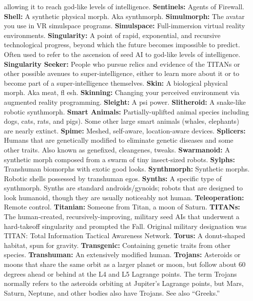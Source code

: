 allowing it to reach god-like levels of intelligence.
\textbf{ Sentinels:} Agents of Firewall.
\textbf{ Shell:} A synthetic physical morph. Aka synthmorph.
\textbf{ Simulmorph:} The avatar you use in VR simulspace 
programs.
\textbf{ Simulspace:} Full-immersion virtual reality environments.
\textbf{ Singularity:} A point of rapid, exponential, and recursive 
technological progress, beyond which the future becomes 
impossible to predict. Often used to refer to the ascension 
of seed AI to god-like levels of intelligence.
\textbf{ Singularity Seeker:} People who pursue relics and 
evidence of the TITANs or other possible avenues to 
super-intelligence, either to learn more about it or to 
become part of a super-intelligence themselves.
\textbf{ Skin:} A biological physical morph. Aka meat, ﬂ esh.
\textbf{ Skinning:} Changing your perceived environment via 
augmented reality programming.
\textbf{ Sleight:} A psi power.
\textbf{ Slitheroid:} A snake-like robotic synthmorph.
\textbf{ Smart Animals:} Partially-uplifted animal species including
dogs, cats, rats, and pigs). Some other large smart
animals (whales, elephants) are nearly extinct.
\textbf{ Spime:} Meshed, self-aware, location-aware devices.
\textbf{ Splicers:} Humans that are genetically modified to 
eliminate genetic diseases and some other traits. Also 
known as genefixed, cleangenes, tweaks.
\textbf{ Swarmanoid:} A synthetic morph composed from a 
swarm of tiny insect-sized robots.
\textbf{ Sylphs:} Transhuman biomorphs with exotic good looks.
\textbf{ Synthmorph:} Synthetic morphs. Robotic shells possessed 
by transhuman egos.
\textbf{ Synths:} A specific type of synthmorph. Synths are 
standard androids/gynoids; robots that are designed to 
look humanoid, though they are usually noticeably not 
human.
\textbf{ Teleoperation:} Remote control.
\textbf{ Titanian:} Someone from Titan, a moon of Saturn.
\textbf{ TITANs:} The human-created, recursively-improving, 
military seed AIs that underwent a hard-takeoff singularity
and prompted the Fall. Original military designation
was TITAN: Total Information Tactical Awareness Network.
\textbf{ Torus:} A donut-shaped habitat, spun for gravity.
\textbf{ Transgenic:} Containing genetic traits from other species.
\textbf{ Transhuman:} An extensively modified human.
\textbf{ Trojans:} Asteroids or moons that share the same orbit 
as a larger planet or moon, but follow about 60 degrees 
ahead or behind at the L4 and L5 Lagrange points. The 
term Trojans normally refers to the asteroids orbiting at 
Jupiter's Lagrange points, but Mars, Saturn, Neptune, and 
other bodies also have Trojans. See also ``Greeks.''
